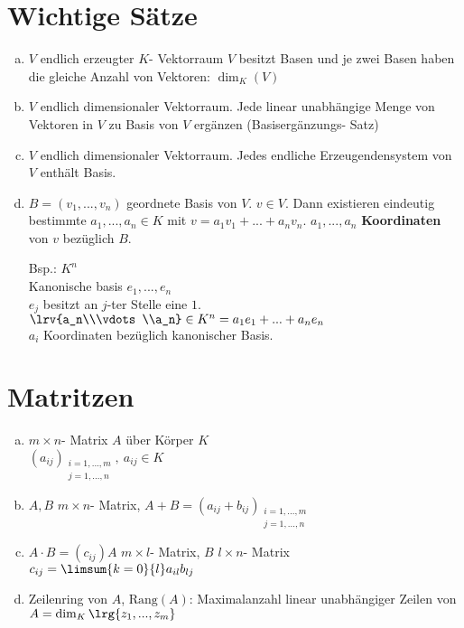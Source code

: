 \section{Wichtige Sätze}
	\begin{enumerate}[a)]
		\item $V$ endlich erzeugter $K$- Vektorraum $V$ besitzt Basen und je zwei Basen haben die gleiche Anzahl von Vektoren: $\dim_K(V)$
		\item $V$ endlich dimensionaler Vektorraum. Jede linear unabhängige Menge von Vektoren in $V$ zu Basis von $V$ ergänzen (Basisergänzungs- Satz)
		\item $V$ endlich dimensionaler Vektorraum. Jedes endliche Erzeugendensystem von $V$ enthält Basis.
		\item $B=(v_1,...,v_n)$ geordnete Basis von $V$. $v\in V$. Dann existieren eindeutig bestimmte $a_1,...,a_n\in K$ mit $v=a_1v_1+...+a_nv_n$. $a_1,...,a_n$ \textbf{Koordinaten} von $v$ bezüglich $B$.

		Bsp.: $K^n$\\
		Kanonische basis $e_1,...,e_n$\\
		$e_j$ besitzt an $j$-ter Stelle eine $1$.\\
		$\lrv{a_n\\\vdots\\a_n}\in K^n=a_1e_1+...+a_ne_n$\\
		$a_i$ Koordinaten bezüglich kanonischer Basis.
	\end{enumerate}

\section{Matritzen}
	\begin{enumerate}[a)]
		\item $m\times n$- Matrix $A$ über Körper $K$\\
		$(a_{ij})_{
			\begin{array}{l}
			i=1,...,m\\
			j=1,...,n
			\end{array}
		},\ a_{ij}\in K$
		\item $A,B$ $m\times n$- Matrix, $A+B=(a_{ij}+b_{ij})_{
			\begin{array}{l}
			i=1,...,m\\
			j=1,...,n
			\end{array}
		}$
		\item $A\cdot B=(c_{ij})$\quad $A$ $m\times l$- Matrix, $B$ $l\times n$- Matrix\\
		$c_{ij}=\limsum{k=0}{l}a_{il}b_{lj}$
		\item Zeilenring von $A$, $\mbox{Rang}(A)$: Maximalanzahl linear unabhängiger Zeilen von $A=\dim_K\lrg{z_1,...,z_m}$
	\end{enumerate}

